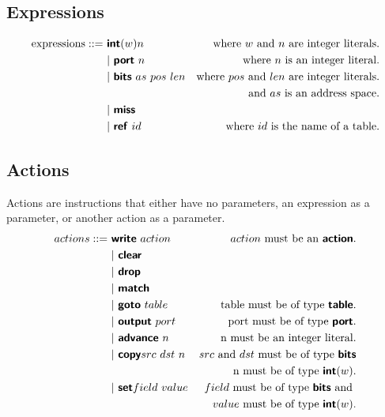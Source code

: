 \subsection{Expressions}
\begin{align*}
  \text{expressions} ::=~& \mathct{int}(w) n    & \text{where} \ w \ \text{and} \ n \ \text{are integer literals.}\\
  & | \ \mathct{port} \ n   & \text{where } n \text{ is an integer literal.}\\
  & | \ \mathct{bits} \ as \ pos \ len &\text{where } pos \text{ and } len \text{ are integer literals.} \\ & &\text{and } as \text{ is an address space.}\\
  & | \ \mathct{miss}\\
  & | \ \mathct{ref} \ id    &\text{where } id \text{ is the name of a table.}
\end{align*}
\subsection{Actions}

Actions are instructions that either have no parameters, an expression as a parameter, or another action as a parameter.
\begin{align*}
actions::=~&  \bm{\mathsf{{write}}} \ action     & action \text{ must be an } \bm{\mathsf{{action}}}.\\
  & | \ \bm{\mathsf{{clear}}}\\
  & | \ \bm{\mathsf{{drop}}}\\
  & | \ \bm{\mathsf{{match}}}\\
  & | \ \bm{\mathsf{{goto}}} \ table             & \text{table must be of type } \bm{\mathsf{{table}}}.\\
  & | \ \bm{\mathsf{{output}}} \ port            & \text{port must be of type } \bm{\mathsf{{port}}}.\\
  & | \ \bm{\mathsf{{advance}}} \ n              & \text{n must be an integer literal.}\\
  & | \ \bm{\mathsf{{copy}}} src \ dst \ n       & src \text{ and } dst \text{ must be of type } \bm{\mathsf{{bits}}} \\
                                         && \text{n must be of type } \bm{\mathsf{{int}}}(w).\\
  & | \ \bm{\mathsf{{set}}} field \ value        & field \text{ must be of type } \bm{\mathsf{{bits}}} \text{ and }\\
                                         && value \text{ must be of type } \bm{\mathsf{{int}}}(w).
\end{align*}
